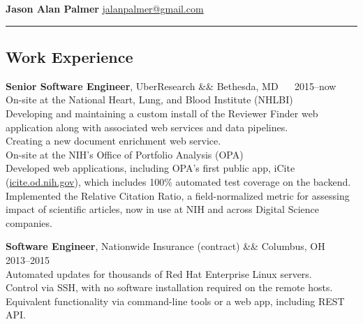 \documentclass[12pt]{report}
\makeatletter
\renewcommand{\bullet}{$\vcenter{\hbox{~\huge$\cdot$~}}$}
\newenvironment{jobhead}
{\tabularx{\textwidth}{ @{} l X r @{} }}
{\endtabularx}
\newenvironment{bullets}
{\tabularx{\textwidth}{ @{\bullet} X @{} }}
{\endtabularx}
\makeatother
\begin{document}
\textbf{\large Jason Alan Palmer} \hfill \href{mailto:jalanpalmer@gmail.com}{jalanpalmer@gmail.com}

\rule{\textwidth}{1pt}

\subsection*{Work Experience}

\begin{jobhead}
\textbf{Senior Software Engineer}, UberResearch && Bethesda, MD ~~ 2015--now \\
\end{jobhead}
On-site at the National Heart, Lung, and Blood Institute (NHLBI) \\
\begin{bullets}
Developing and maintaining a custom install of the Reviewer Finder web application along with associated web services and data pipelines. \\
Creating a new document enrichment web service. \\
\end{bullets}
On-site at the NIH's Office of Portfolio Analysis (OPA) \\
\begin{bullets}
Developed web applications, including OPA's first public app, iCite (\href{https://icite.od.nih.gov}{icite.od.nih.gov}), which includes 100\% automated test coverage on the backend. \\
Implemented the Relative Citation Ratio, a field-normalized metric for assessing impact of scientific articles, now in use at NIH and across Digital Science companies. \\
\end{bullets}

\begin{jobhead}
\textbf{Software Engineer}, Nationwide Insurance (contract) && Columbus, OH ~~ 2013--2015 \\
\end{jobhead}
\begin{bullets}
Automated updates for thousands of Red Hat Enterprise Linux servers. \\
Control via SSH, with no software installation required on the remote hosts. \\
Equivalent functionality via command-line tools or a web app, including REST API. \\
\end{bullets}
\end{document}
